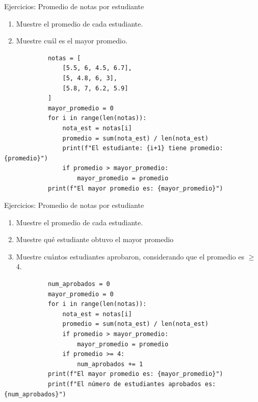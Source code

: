 \documentclass{beamer}
\begin{document}
    \begin{frame}[fragile, t]{Ejercicios: Promedio de notas por estudiante}
        \begin{enumerate}
            \item Muestre el promedio de cada estudiante.
            \item Muestre cuál es el mayor promedio.
        \end{enumerate}
        \begin{verbatim}
            notas = [
                [5.5, 6, 4.5, 6.7], 
                [5, 4.8, 6, 3],
                [5.8, 7, 6.2, 5.9]
            ]
            mayor_promedio = 0
            for i in range(len(notas)):
                nota_est = notas[i]
                promedio = sum(nota_est) / len(nota_est)
                print(f"El estudiante: {i+1} tiene promedio: {promedio}")
                if promedio > mayor_promedio:
                    mayor_promedio = promedio
            print(f"El mayor promedio es: {mayor_promedio}")
        \end{verbatim}
    \end{frame}

    \begin{frame}[fragile, t]{Ejercicios: Promedio de notas por estudiante}
        \begin{enumerate}
            \item Muestre el promedio de cada estudiante.
            \item Muestre qué estudiante obtuvo el mayor promedio
            \item Muestre cuántos estudiantes aprobaron, considerando que el promedio es $\geq$ 4.
        \end{enumerate}
        \begin{verbatim}
            num_aprobados = 0
            mayor_promedio = 0
            for i in range(len(notas)):
                nota_est = notas[i]
                promedio = sum(nota_est) / len(nota_est)
                if promedio > mayor_promedio:
                    mayor_promedio = promedio
                if promedio >= 4:
                    num_aprobados += 1
            print(f"El mayor promedio es: {mayor_promedio}")
            print(f"El número de estudiantes aprobados es: {num_aprobados}")
            \end{verbatim}
    \end{frame}
\end{document}

